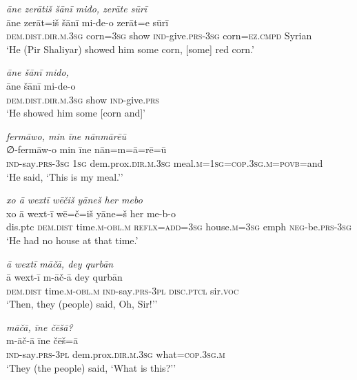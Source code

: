 \ea \label{ŽP.215}
\textit{āne zerātiš šānī miđo, zerāte sūrī} \\ 
\gll āne zerāt=iš šānī mi-đe-o zerāt=e sūrī \\ 
 \textsc{dem.dist}\textsc{.dir}\textsc{.m}\textsc{.3sg} corn\textsc{=3sg} show \textsc{ind-}give\textsc{.prs}\textsc{-3sg} corn\textsc{=ez}\textsc{.cmpd} Syrian \\ 
\glt `He (Pir Shaliyar) showed him some corn, [some] red corn.'
\z 
 
\ea \label{ŽP.216}
\textit{āne šānī mido,} \\ 
\gll āne šānī mi-de-o \\ 
 \textsc{dem.dist}\textsc{.dir}\textsc{.m}\textsc{.3sg} show \textsc{ind-}give\textsc{.prs} \\ 
\glt `He showed him some [corn and]'
\z 
 
\ea \label{ŽP.217}
\textit{fermāwo, min īne nānmārēū} \\ 
\gll ∅-fermāw-o min īne nān=m=ā=rē=ū \\ 
 \textsc{ind-}say\textsc{.prs}\textsc{-3sg} \textsc{1sg} dem.prox\textsc{.dir}\textsc{.m}\textsc{.3sg} meal\textsc{.m}\textsc{=\textsc{1sg}}\textsc{=cop}\textsc{.3sg}\textsc{.m}\textsc{=\textsc{povb}}=and \\ 
\glt `He said, ‘This is my meal.’'
\z 
 
\ea \label{ŽP.219}
\textit{xo ā wextī wēčiš yāneš her mebo} \\ 
\gll xo ā wext-ī wē=č=iš yāne=š her me-b-o \\ 
 dis.ptc \textsc{dem.dist} time\textsc{.m}\textsc{-obl}\textsc{.m} \textsc{reflx}\textsc{=add}\textsc{=3sg} house\textsc{.m}\textsc{=3sg} emph \textsc{neg-}be\textsc{.prs}\textsc{-3sg} \\ 
\glt `He had no house at that time.'
\z 
 
\ea \label{ŽP.220}
\textit{ā wextī māčā, dey qurbān} \\ 
\gll ā wext-ī m-āč-ā dey qurbān \\ 
 \textsc{dem.dist} time\textsc{.m}\textsc{-obl}\textsc{.m} \textsc{ind-}say\textsc{.prs}\textsc{-3pl} \textsc{disc.ptcl} sir.\textsc{voc} \\ 
\glt `Then, they (people) said, Oh, Sir!’'
\z 
 
\ea \label{ŽP.222}
\textit{māčā, īne čēšā?} \\ 
\gll m-āč-ā īne čēš=ā \\ 
 \textsc{ind-}say\textsc{.prs}\textsc{-3pl} dem.prox\textsc{.dir}\textsc{.m}\textsc{.3sg} what\textsc{=cop}\textsc{.3sg}\textsc{.m} \\ 
\glt `They (the people) said, ‘What is this?’'
\z 
 
